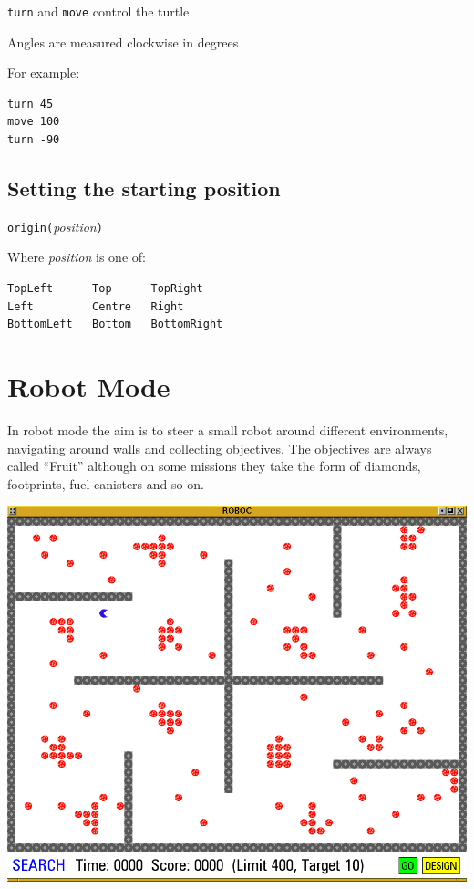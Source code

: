 \documentclass[12pt,a4paper,twoside]{article}
\renewcommand{\_}{\texttt{\symbol{95}}}
\begin{document}
\begin{bulletlist}
\item \verb^turn^ and \verb^move^ control the turtle
\item Angles are measured clockwise in degrees
\end{bulletlist}

For example:
\begin{verbatim}
turn 45
move 100
turn -90
\end{verbatim}

\subsection{Setting the starting position}

\verb^origin(^\emph{position}\verb^)^

Where \emph{position} is one of:
\begin{verbatim}
TopLeft      Top      TopRight
Left         Centre   Right
BottomLeft   Bottom   BottomRight
\end{verbatim}

\newpage
\section{Robot Mode} \label{sec:robot-mode}

In robot mode the aim is to steer a small robot around different
environments, navigating around walls and collecting objectives. The
objectives are always called ``Fruit'' although on some missions they
take the form of diamonds, footprints, fuel canisters and so on.

\begin{center}
\includegraphics[scale=0.6,angle=0]{screenshots/robot/search}
\end{center}
\end{document}
